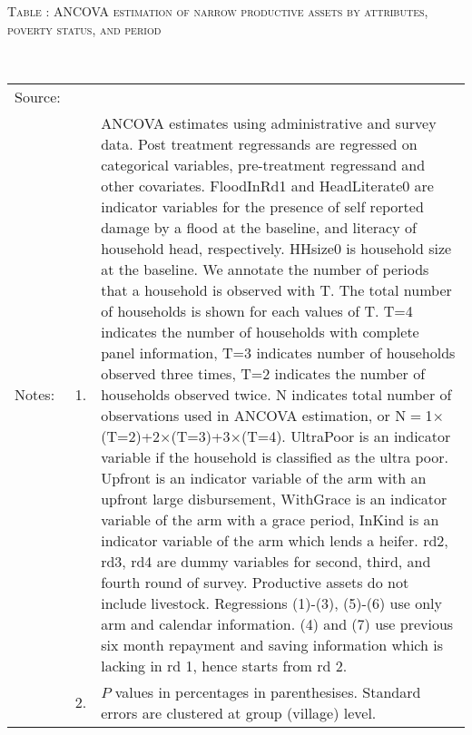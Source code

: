 \hspace{-1cm}\begin{minipage}[t]{14cm}
\hfil\textsc{\normalsize Table \thetable: ANCOVA estimation of narrow productive assets by attributes, poverty status, and period\label{tab ANCOVA narrow productive assets timevarying poverty status attributes}}\\
\setlength{\tabcolsep}{1pt}
\setlength{\baselineskip}{8pt}
\renewcommand{\arraystretch}{.55}
\hfil{}\\
\renewcommand{\arraystretch}{.8}
\setlength{\tabcolsep}{1pt}
\begin{tabular}{>{\hfill\scriptsize}p{1cm}<{}>{\hfill\scriptsize}p{.25cm}<{}>{\scriptsize}p{12cm}<{\hfill}}
Source:& \multicolumn{2}{l}{\scriptsize Estimated with GUK administrative and survey data.}\\
Notes: & 1. & ANCOVA estimates using administrative and survey data. Post treatment regressands are regressed on categorical variables, pre-treatment regressand and other covariates. \textsf{FloodInRd1} and \textsf{HeadLiterate0} are indicator variables for the presence of self reported damage by a flood at the baseline, and literacy of household head, respectively. \textsf{HHsize0} is household size at the baseline. We annotate the number of periods that a household is observed with \textsf{T}. The total number of households is shown for each values of \textsf{T}. \textsf{T=4} indicates the number of households with complete panel information, \textsf{T=3} indicates number of households observed three times, \textsf{T=2} indicates the number of households observed twice. \textsf{N} indicates total number of observations used in ANCOVA estimation, or \textsf{N$=$1$\times$(T=2)+2$\times$(T=3)+3$\times$(T=4)}.  \textsf{UltraPoor} is an indicator variable if the household is classified as the ultra poor. \textsf{Upfront} is an indicator variable of the arm with an upfront large disbursement, \textsf{WithGrace} is an indicator variable of the arm with a grace period, \textsf{InKind} is an indicator variable of the arm which lends a heifer. \textsf{rd2, rd3, rd4} are dummy variables for second, third, and fourth round of survey. Productive assets do not include livestock. Regressions (1)-(3), (5)-(6) use only arm and calendar information. (4) and (7) use previous six month repayment and saving information which is lacking in rd 1, hence starts from rd 2.\\
& 2. & $P$ values in percentages in parenthesises. Standard errors are clustered at group (village) level.
\end{tabular}
\end{minipage}




